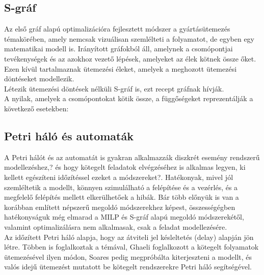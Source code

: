\documentclass {report}
\begin{document}
 \subsection{S-gráf}
   Az első gráf alapú optimalizációra fejlesztett módszer a gyártásütemezés témakörében, amely nemcsak vizuálisan szemlélteti a folyamatot, de egyben egy matematikai modell is. Irányított gráfokból áll, amelynek a csomópontjai tevékenységek és az azokhoz vezető lépések, amelyeket az élek kötnek össze őket. Ezen kívül tartalmaznak ütemezési éleket, amelyek a meghozott ütemezési döntéseket modellezik.\\
   Létezik ütemezési döntések nélküli S-gráf is, ezt recept gráfnak hívják. \\
   A nyilak,  amelyek a csomópontokat kötik össze, a függőségeket reprezentálják a következő esetekben:

\subsection{Petri háló és automaták}
A Petri hálót és az automatát is gyakran alkalmazzák diszkrét esemény rendszerű modellezéshez,? és hogy kötegelt feladatok elvégzéséhez is alkalmas legyen, ki kellett egészíteni  időzítéssel ezeket a módszereket?. Hatékonyak, mivel jól szemléltetik a modellt, könnyen szimulálható a felépítése és a vezérlés, és a megfelelő felépítés mellett elkerülhetőek a hibák. Bár több előnyük is van a korábban említett népszerű megoldó módszerekhez képest, összességégben hatékonyságuk még elmarad a MILP és S-gráf alapú megoldó módszerekétől, valamint optimalizálásra nem alkalmasak, csak a feladat modellezésére. \\
Az időzített Petri háló alapja, hogy az átviteli jel késleltetés (delay) alapján jön létre. Többen is foglalkoztak a témával, Ghaeli foglalkozott a kötegelt folyamatok ütemezésével ilyen módon, Soares pedig megpróbálta kiterjeszteni a modellt, és valós idejű ütemezést mutatott be kötegelt rendszerekre Petri háló segítségével. 
\end{document}
